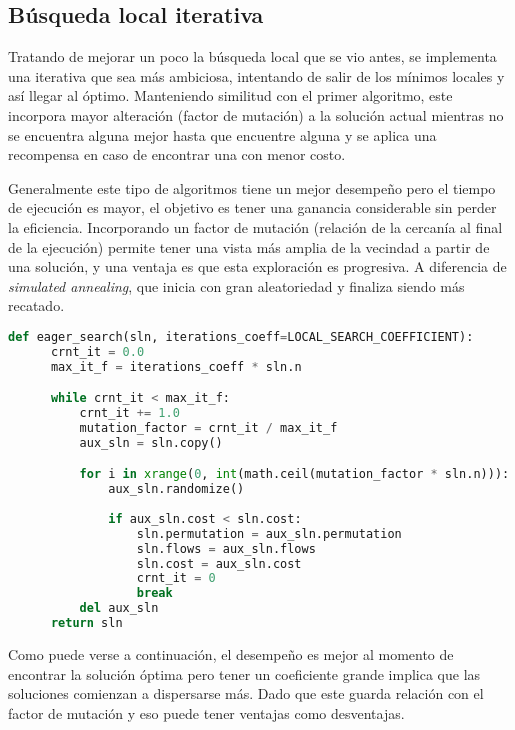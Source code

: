 \subsection*{Búsqueda local iterativa}

Tratando de mejorar un poco la búsqueda local que se vio antes, se implementa una iterativa que sea más ambiciosa, intentando de salir de los mínimos locales y así llegar al óptimo. Manteniendo similitud con el primer algoritmo, este incorpora mayor alteración (factor de mutación) a la solución actual mientras no se encuentra alguna mejor hasta que encuentre alguna y se aplica una recompensa en caso de encontrar una con menor costo.

Generalmente este tipo de algoritmos tiene un mejor desempeño pero el tiempo de ejecución es mayor, el objetivo es tener una ganancia considerable sin perder la eficiencia. Incorporando un factor de mutación (relación de la cercanía al final de la ejecución) permite tener una vista más amplia de la vecindad a partir de una solución, y una ventaja es que esta exploración es progresiva. A diferencia de \textit{simulated annealing}, que inicia con gran aleatoriedad y finaliza siendo más recatado.

\newpage

\begin{lstlisting}[language=Python]
  def eager_search(sln, iterations_coeff=LOCAL_SEARCH_COEFFICIENT):
      crnt_it = 0.0
      max_it_f = iterations_coeff * sln.n

      while crnt_it < max_it_f:
          crnt_it += 1.0
          mutation_factor = crnt_it / max_it_f
          aux_sln = sln.copy()

          for i in xrange(0, int(math.ceil(mutation_factor * sln.n))):
              aux_sln.randomize()
              
              if aux_sln.cost < sln.cost:
                  sln.permutation = aux_sln.permutation
                  sln.flows = aux_sln.flows
                  sln.cost = aux_sln.cost
                  crnt_it = 0
                  break
          del aux_sln
      return sln
\end{lstlisting}

Como puede verse a continuación, el desempeño es mejor al momento de encontrar la solución óptima pero tener un coeficiente grande implica que las soluciones comienzan a dispersarse más. Dado que este guarda relación con el factor de mutación y eso puede tener ventajas como desventajas.

